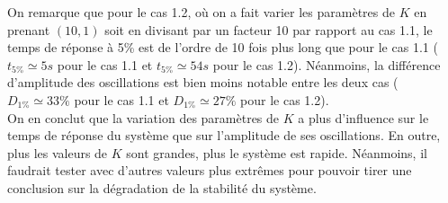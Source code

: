 \documentclass[a4paper]{article}
\begin{document}
                        On remarque que pour le cas 1.2, où on a fait varier les paramètres de $K$ en prenant $(10,1)$ soit en divisant par un facteur 10
                        par rapport au cas 1.1, le temps de réponse à 5\% est de l'ordre de 10 fois plus long que pour le cas 1.1
                        ($t_{5\%} \simeq 5s$ pour le cas 1.1 et $t_{5\%} \simeq 54s$ pour le cas 1.2).
                        Néanmoins, la différence d'amplitude des oscillations est bien moins notable entre les deux cas
                        ($D_{1\%} \simeq 33\%$ pour le cas 1.1 et $D_{1\%} \simeq 27\%$ pour le cas 1.2). \\

                        On en conclut que la variation des paramètres de $K$ a plus d'influence sur le temps de réponse du système que sur l'amplitude de ses oscillations.
                        En outre, plus les valeurs de $K$ sont grandes, plus le système est rapide. 
                        Néanmoins, il faudrait tester avec d'autres valeurs plus extrêmes pour pouvoir tirer une conclusion sur la dégradation de la stabilité du système.
\end{document}
